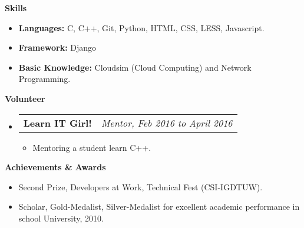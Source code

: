\documentclass[letterpaper,10pt]{article}
\makeatletter
\newcommand{\resitem}[1]{\item #1 \vspace{-2pt}}
\newcommand{\resheading}[1]{{\large \colorbox{mygrey}{\begin{minipage}{\textwidth}{\textbf{#1 \vphantom{p\^{E}}}}\end{minipage}}}}
\newcommand{\ressubheading}[4]{
\begin{tabular*}{7.0in}{l@{\extracolsep{\fill}}r}
		\textbf{#1} & \textit{#4} \\
\end{tabular*}\vspace{-6pt}}
\makeatother
\begin{document}
\resheading{Skills}
\begin{itemize}
\item \textbf{Languages:} C, C++, Git, Python, HTML, CSS, LESS, Javascript.

\item \textbf{Framework:} Django

\item \textbf{Basic Knowledge:} Cloudsim (Cloud Computing) and Network Programming.

\end{itemize}

\resheading{Volunteer}
\begin{itemize}

\item
	\ressubheading{Learn IT Girl!}{Remote}{Mentor}{Mentor, Feb 2016 to April 2016}
	\begin{itemize}
		\resitem{Mentoring a student learn C++.}
	\end{itemize}
\end{itemize}



\resheading{Achievements \& Awards}
\begin{itemize}
	\item Second Prize, Developers at Work, Technical Fest (CSI-IGDTUW).
    
	\item Scholar, Gold-Medalist, Silver-Medalist for excellent academic performance in school 
University, 2010.
\end{itemize}
\end{document}
